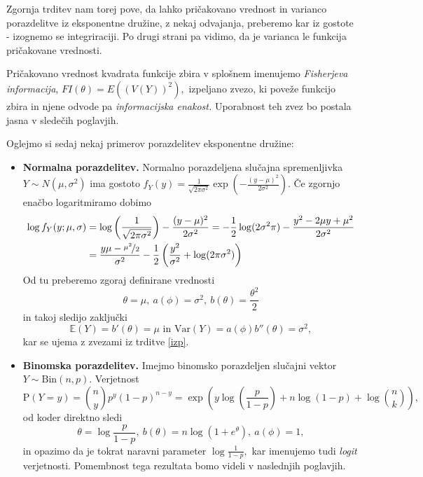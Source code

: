 \documentclass[12pt,a4paper]{amsart}
\theoremstyle{definition} %
\theoremstyle{plain} %
\begin{document}
Zgornja trditev nam torej pove, da lahko pričakovano vrednost in varianco porazdelitve iz eksponentne družine, z nekaj odvajanja, preberemo kar iz gostote - izognemo se integriraciji. Po drugi
strani pa vidimo, da je varianca le funkcija pričakovane vrednosti. 

Pričakovano vrednost kvadrata funkcije zbira v splošnem imenujemo \textit{Fisherjeva informacija}, $FI(\theta) = E((V(Y))^2),$ izpeljano zvezo, ki poveže funkcijo zbira in njene odvode pa \textit{informacijska enakost.}
Uporabnost teh zvez bo postala jasna v sledečih poglavjih.

Oglejmo si sedaj nekaj primerov porazdelitev eksponentne družine:
\begin{itemize}
    \item \textbf{Normalna porazdelitev.} Normalno porazdeljena slučajna spremenljivka $Y \sim N(\mu, \sigma^2)$
    ima gostoto $f_{Y}(y) = \frac{1}{\sqrt{2\pi\sigma^2}}\exp{\left(-\frac{(y-\mu)^2}{2\sigma^2}\right)}.$
    Če zgornjo enačbo logaritmiramo dobimo
    \begin{align*}
        \log f_{Y}(y;\mu, \sigma) &= \log\left(\frac{1}{\sqrt{2\pi\sigma^2}}\right) -\frac{(y-\mu)^2}{2\sigma^2} = -\frac{1}{2}\log(2\sigma^2\pi) - \frac{y^2 - 2\mu y + \mu^2}{2 \sigma^2}    \\ \nonumber
                            &= \frac{y\mu-\nicefrac{\mu^2}{2}}{\sigma^2} - \frac{1}{2}\left(\frac{y^2}{\sigma^2} + \log(2\pi\sigma^2)\right) 
    \end{align*}
    Od tu preberemo zgoraj definirane vrednosti
    \[
        \theta = \mu,~a(\phi) = \sigma^2,~b(\theta) = \frac{\theta^2}{2}
    \]
    in takoj sledijo zaključki
    \[
        \mathbb{E}(Y) = b'(\theta) = \mu \text{ in } \mathrm{Var}(Y) = a(\phi)b''(\theta) = \sigma^2,
    \]
    kar se ujema z zvezami iz trditve \ref{izp}.

    \item \textbf{Binomska porazdelitev.} Imejmo binomsko porazdeljen slučajni vektor $Y \sim \mathrm{Bin}(n,p).$ Verjetnost 
    \[
        \mathrm{P}(Y = y) = \binom{n}{y}p^y(1-p)^{n-y} = \exp\left(y\log(\frac{p}{1-p}) + n\log(1-p) + \log{\binom{n}{k}}\right),
    \]
    od koder direktno sledi
    \[
        \theta = \log\frac{p}{1-p},~b(\theta) = n\log(1 + e^{\theta}),~a(\phi) = 1,
    \]
    in opazimo da je tokrat naravni parameter $\log\frac{1}{1-p},$ kar imenujemo tudi \textit{logit} verjetnosti. Pomembnost tega rezultata 
    bomo videli v naslednjih poglavjih.
\end{itemize}
\end{document}
